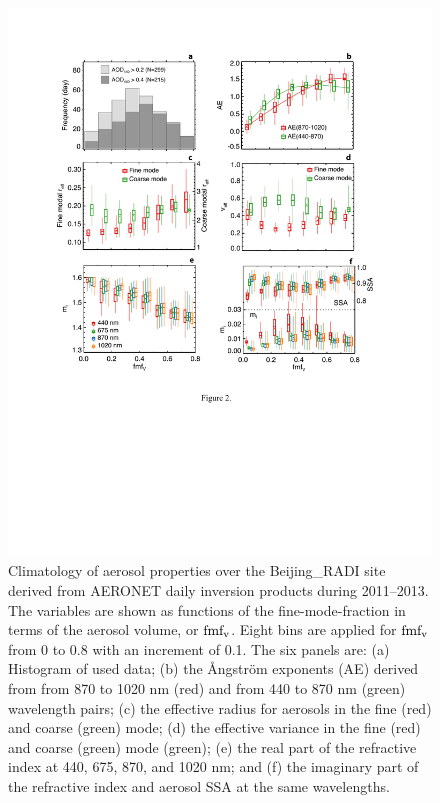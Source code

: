 \begin{figure}[p]
  \centering
  \includegraphics[width={\textwidth}]{figures/inv01.pdf}
  \caption[Climatology of aerosol properties over the Beijing\_RADI site
derived from AERONET daily inversion products during 2011--2013.]
  {Climatology of aerosol properties over the Beijing\_RADI site derived
from AERONET daily inversion products during 2011--2013. The variables are shown
as functions of the fine-mode-fraction in terms of the aerosol volume, or
$\text{fmf}_\text{v}$. Eight bins are applied for $\text{fmf}_\text{v}$ from 0 to 0.8 with an increment of 0.1.
The six panels are: (a) Histogram of used data; (b) the Ångström exponents (AE)
derived from from 870 to 1020 nm (red) and from 440 to 870 nm (green)
wavelength pairs; (c) the effective radius for aerosols in the fine (red) and
coarse (green) mode; (d) the effective variance in the fine (red) and coarse
(green) mode (green); (e) the real part of the refractive index at 440, 675,
870, and 1020 nm; and (f) the imaginary part of the refractive index and
aerosol SSA at the same wavelengths.}
  \label{fig:invap}
\end{figure}


